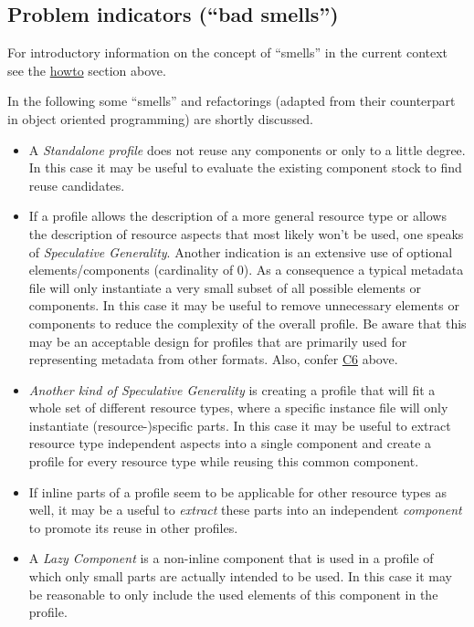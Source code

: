 \subsection{Problem indicators (``bad
smells'')} \label{modelling-bad-smells}


For introductory information on the concept of ``smells'' in the current context see the \hyperref[howto]{howto} section above.

In the following some ``smells'' and refactorings (adapted from their counterpart in object oriented programming) are shortly discussed. 

\begin{itemize}
\tightlist
\item
  A \emph{Standalone profile} does not reuse any components or only to a little degree. In this case it may be useful to evaluate the existing component stock to find reuse candidates.
\item
  If a profile allows the description of a more general resource type or allows the description of resource aspects that most likely won't be used, one speaks of \emph{Speculative Generality}. Another indication
  is an extensive use of optional elements/components (cardinality of 0). As a consequence a typical metadata file will only instantiate a very small subset of all possible elements or components. In this case it may be useful to remove unnecessary elements or components to reduce the complexity of the overall profile. Be aware that this may
  be an acceptable design for profiles that are primarily used for representing metadata from other formats. Also, confer
  \hyperref[c6]{C6} above.
\item
  \emph{Another kind of Speculative Generality} is creating a profile that will fit a whole set of different resource types, where a specific instance file will only instantiate (resource-)specific parts. In this case it may be useful to extract resource type independent aspects into a single component and create a profile for every resource type while reusing this common component.
\item
  If inline parts of a profile seem to be applicable for other resource types as well, it may be a useful to \emph{extract} these parts into an independent \emph{component} to promote its reuse in other profiles.
\item
  A \emph{Lazy Component} is a non-inline component that is used in a profile of which only small parts are actually intended to be used. In this case it may be reasonable to only include the used elements of this component in the profile.

\end{itemize}
